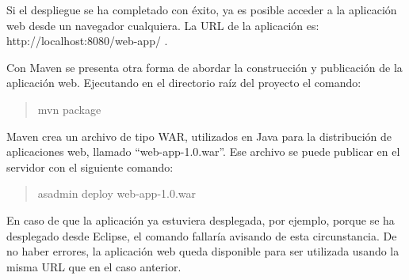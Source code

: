 
Si el despliegue se ha completado con éxito, ya es posible acceder a la
aplicación web desde un navegador cualquiera. La URL de la aplicación es:
http://localhost:8080/web-app/ .


Con Maven se presenta otra forma de abordar la construcción y publicación de la
aplicación web. Ejecutando en el directorio raíz del proyecto el comando:
\begin{quotation}
  mvn package
\end{quotation}
Maven crea un archivo de tipo WAR, utilizados en Java para la distribución de
aplicaciones web, llamado ``web-app-1.0.war''. Ese archivo se puede publicar
en el servidor con el siguiente comando:
\begin{quotation}
  asadmin deploy web-app-1.0.war
\end{quotation}
En caso de que la aplicación ya estuviera desplegada, por ejemplo, porque se ha
desplegado desde Eclipse, el comando fallaría avisando de esta circunstancia.
De no haber errores, la aplicación web queda disponible para ser utilizada
usando la misma URL que en el caso anterior. 



